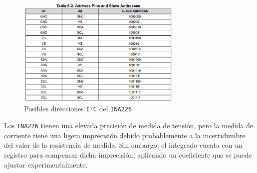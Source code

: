 \begin{figure}[H]
    \centering
    \includegraphics[width=0.7\textwidth]{images/2-hardware/componentes/direcciones_ina.png}
    \caption{Posibles direcciones \texttt{I²C} del \texttt{INA226}}
    \label{fig:hardware/modulos/direcciones_ina}
\end{figure}

Los \texttt{INA226} tienen una elevada precisión de medida de tensión, pero la medida de corriente tiene una ligera imprecisión debido probablemente a la incertidumbre del valor de la resistencia de medida. Sin embargo, el integrado cuenta con un registro para compensar dicha imprecisión, aplicando un coeficiente que se puede ajustar experimentalmente.
